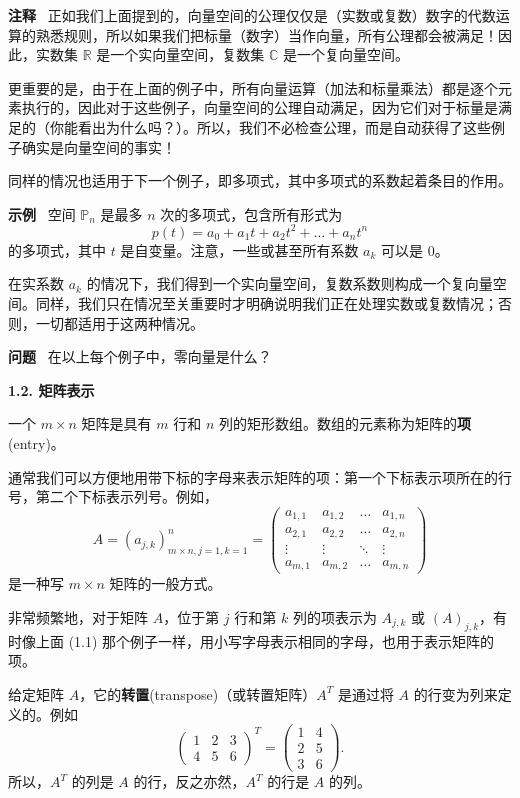 \textbf{注释}~ 正如我们上面提到的，向量空间的公理仅仅是（实数或复数）数字的代数运算的熟悉规则，所以如果我们把标量（数字）当作向量，所有公理都会被满足！因此，实数集 $\mathbb{R}$ 是一个实向量空间，复数集 $\mathbb{C}$ 是一个复向量空间。

更重要的是，由于在上面的例子中，所有向量运算（加法和标量乘法）都是逐个元素执行的，因此对于这些例子，向量空间的公理自动满足，因为它们对于标量是满足的（你能看出为什么吗？）。所以，我们不必检查公理，而是自动获得了这些例子确实是向量空间的事实！

同样的情况也适用于下一个例子，即多项式，其中多项式的系数起着条目的作用。

\textbf{示例}~ 空间 $\mathbb{P}_n$ 是最多 $n$ 次的多项式，包含所有形式为
$$p(t) = a_0 + a_1 t + a_2 t^2 + \dots + a_n t^n$$
的多项式，其中 $t$ 是自变量。注意，一些或甚至所有系数 $a_k$ 可以是 0。

在实系数 $a_k$ 的情况下，我们得到一个实向量空间，复数系数则构成一个复向量空间。同样，我们只在情况至关重要时才明确说明我们正在处理实数或复数情况；否则，一切都适用于这两种情况。

\textbf{问题}~ 在以上每个例子中，零向量是什么？

\textbf{1.2. 矩阵表示}

一个 $m \times n$ 矩阵是具有 $m$ 行和 $n$ 列的矩形数组。数组的元素称为矩阵的\textbf{项}(entry)。

通常我们可以方便地用带下标的字母来表示矩阵的项：第一个下标表示项所在的行号，第二个下标表示列号。例如，
\begin{equation}
A = (a_{j,k})_{m \times n, j=1, k=1}^n = \begin{pmatrix}
a_{1,1} & a_{1,2} & \dots & a_{1,n} \\
a_{2,1} & a_{2,2} & \dots & a_{2,n} \\
\vdots & \vdots & \ddots & \vdots \\
a_{m,1} & a_{m,2} & \dots & a_{m,n}
\end{pmatrix}
\end{equation}
是一种写 $m \times n$ 矩阵的一般方式。

非常频繁地，对于矩阵 $A$，位于第 $j$ 行和第 $k$ 列的项表示为 $A_{j,k}$ 或 $(A)_{j,k}$，有时像上面 (1.1) 那个例子一样，用小写字母表示相同的字母，也用于表示矩阵的项。

给定矩阵 $A$，它的\textbf{转置}(transpose)（或转置矩阵）$A^T$ 是通过将 $A$ 的行变为列来定义的。例如
$$
\begin{pmatrix} 1 & 2 & 3 \\ 4 & 5 & 6 \end{pmatrix}^T = \begin{pmatrix} 1 & 4 \\ 2 & 5 \\ 3 & 6 \end{pmatrix}.
$$
所以，$A^T$ 的列是 $A$ 的行，反之亦然，$A^T$ 的行是 $A$ 的列。

